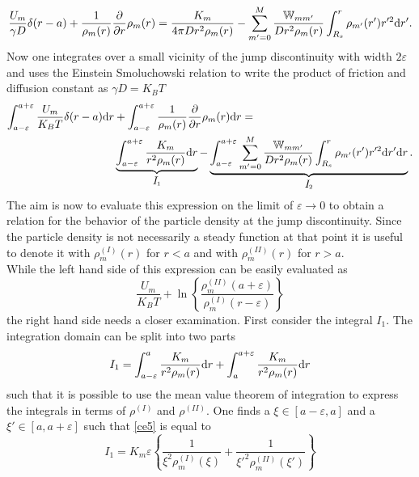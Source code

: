 \begin{equation}
    \frac{U_m}{\gamma D} \delta (r-a) + \frac{1}{\rho_m(r)}\frac{\partial}{\partial r} \rho_m(r) = \frac{K_m}{4 \pi D r^2 \rho_m(r)} - \sum_{m'=0}^{M} \frac{\mathbb{W}_{mm'}}{D r^{2} \rho_{m}(r)}\int_{R_s}^{r} \rho_{m'}(r')r'^2{\rm d} r'.
    \label{ce2}
\end{equation}
Now one integrates over a small vicinity of the jump discontinuity with width $2 \varepsilon$ and uses the Einstein Smoluchowski relation to write the product of friction and diffusion constant as $\gamma D = K_B T$
\begin{align}
    \int_{a-\varepsilon}^{a + \varepsilon} \frac{U_m}{K_B T}\delta(r-a) {\rm d}r &+ \int_{a-\varepsilon}^{a + \varepsilon} \frac{1}{\rho_m(r)}\frac{\partial}{\partial r} \rho_m(r){\rm d} r = \nonumber \\
    & \underbrace{\int_{a-\varepsilon}^{a+\varepsilon}\frac{K_m}{r^2 \rho_m(r)}{\rm d}r}_{\textit{\normalsize I}_1} - \underbrace{\int_{a-\varepsilon}^{a+\varepsilon}\sum_{m'=0}^{M} \frac{\mathbb{W}_{mm'}}{Dr^2 \rho_m(r)}\int_{R_s}^{r}\rho_{m'}(r')r'^2{\rm d}r'{\rm d}r}_{\textit{\normalsize I}_2}.
    \label{ce3}
    \end{align}
    The aim is now to evaluate this expression on the limit of $\varepsilon \rightarrow 0$ to obtain a relation for the behavior of the particle density at the jump discontinuity. Since the particle density is not necessarily a steady function at that point it is useful to denote it with $\rho^{(I)}_m(r)$ for $r<a$ and with $\rho^{(II)}_m(r)$ for $r>a$. \\
While the left hand side of this expression can be easily evaluated as
\begin{equation}
    \frac{U_m}{K_B T} + \ln \left\{\frac{\rho^{(II)}_m(a+\varepsilon)}{\rho^{(I)}_m(r-\varepsilon)}\right\}
    \label{ce4}
\end{equation}
the right hand side needs a closer examination. First consider the integral $I_1$. The integration domain can be split into two parts
\begin{equation}
    I_1 = \int_{a-\varepsilon}^{a}\frac{K_m}{r^2 \rho_m(r)}{\rm d}r + \int_{a}^{a+\varepsilon}\frac{K_m}{r^2 \rho_m(r)}{\rm d}r
    \label{ce5}
\end{equation}
such that it is possible to use the mean value theorem of integration to express the integrals in terms of $\rho^{(I)}$ and $\rho^{(II)}$. 
One finds a $\xi \in [a-\varepsilon,a]$ and a $\xi' \in [a, a+\varepsilon]$ such that \eqref{ce5} is equal to
\begin{equation}
    I_1 = K_m \varepsilon \left\{ \frac{1}{\xi^{2} \rho^{(I)}_{m}(\xi)} + \frac{1}{\xi'^{2}\rho^{(II)}_m(\xi')} \right\}
    \label{ce6}
\end{equation}
